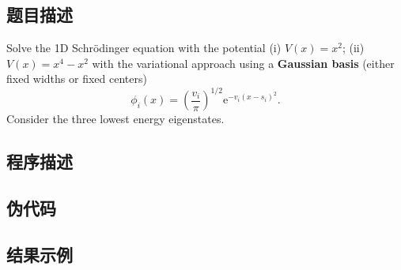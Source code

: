 \subsection{题目描述}
Solve the 1D Schrödinger equation with the potential (i) \( V(x) = x^2 \); (ii) \( V(x) = x^4 - x^2 \) with the variational approach using a \textbf{Gaussian basis} (either fixed widths or fixed centers)
\[
    \phi_i(x)=(\frac{v_i}\pi)^{1/2} \mathrm{e}^{-v_i(x-s_i)^2}.
\]
Consider the three lowest energy eigenstates.

\subsection{程序描述}

\subsection{伪代码}

\subsection{结果示例}
